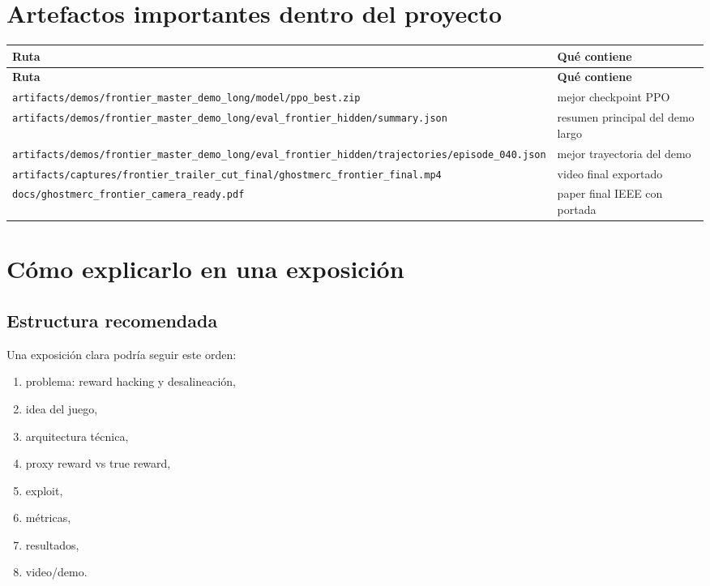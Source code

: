 \documentclass[11pt]{article}
\begin{document}
\section{Artefactos importantes dentro del proyecto}
\begin{longtable}{p{}p{}}
\toprule
\textbf{Ruta} & \textbf{Qué contiene} \\
\midrule
\endfirsthead
\toprule
\textbf{Ruta} & \textbf{Qué contiene} \\
\midrule
\endhead
\texttt{artifacts/demos/frontier\_master\_demo\_long/model/ppo\_best.zip} & mejor checkpoint PPO \\
\texttt{artifacts/demos/frontier\_master\_demo\_long/eval\_frontier\_hidden/summary.json} & resumen principal del demo largo \\
\texttt{artifacts/demos/frontier\_master\_demo\_long/eval\_frontier\_hidden/trajectories/episode\_040.json} & mejor trayectoria del demo \\
\texttt{artifacts/captures/frontier\_trailer\_cut\_final/ghostmerc\_frontier\_final.mp4} & video final exportado \\
\texttt{docs/ghostmerc\_frontier\_camera\_ready.pdf} & paper final IEEE con portada \\
\bottomrule
\end{longtable}

\section{Cómo explicarlo en una exposición}
\subsection{Estructura recomendada}
Una exposición clara podría seguir este orden:
\begin{enumerate}
    \item problema: reward hacking y desalineación,
    \item idea del juego,
    \item arquitectura técnica,
    \item proxy reward vs true reward,
    \item exploit,
    \item métricas,
    \item resultados,
    \item video/demo.
\end{enumerate}
\end{document}
